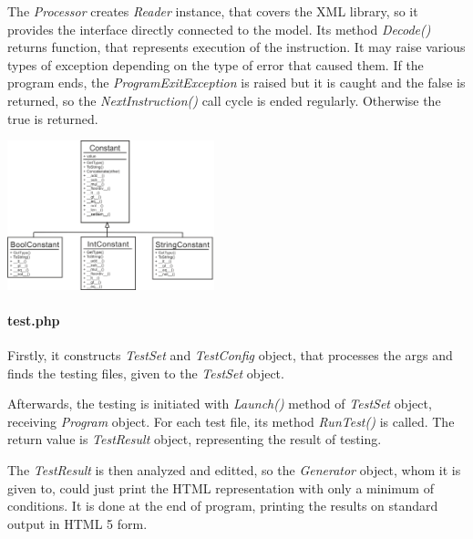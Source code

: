 \documentclass[10pt,a4paper,titlepage]{article}
\begin{document}
The {\it Processor} creates {\it Reader} instance, that covers the XML library,
so it provides the interface directly connected to the model. Its method
{\it Decode()} returns function, that represents execution of the instruction.
It may raise various types of exception depending on the type of error that
caused them. If the program ends, the {\it ProgramExitException} is raised
but it is caught and the false is returned, so the {\it NextInstruction()} call
cycle is ended regularly. Otherwise the true is returned.




\begin{multicols}{2}
\includegraphics[width=0.45\textwidth]{interpret_constant.png}

\end{multicols}



\paragraph{test.php}
Firstly, it constructs {\it TestSet} and {\it TestConfig} object, that processes
the args and finds the testing files, given to the {\it TestSet} object.

Afterwards, the testing is initiated with {\it Launch()} method of
{\it TestSet} object, receiving {\it Program} object. For each test file,
its method {\it RunTest()} is called. The return value is {\it TestResult}
object, representing the result of testing.

The {\it TestResult} is then analyzed and editted, so the {\it Generator}
object, whom it is given to, could just print the HTML representation with only
a minimum of conditions. It is done at the end of program, printing the
results on standard output in HTML 5 form.
\end{document}
